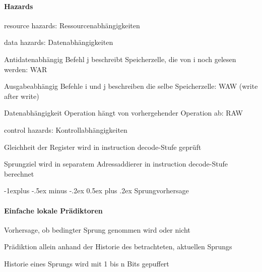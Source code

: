 \documentclass[10pt,landscape]{article}
\makeatletter
\renewcommand{\subsection}{\@startsection{subsection}{2}{0mm}%
                                {-1explus -.5ex minus -.2ex}%
                                {0.5ex plus .2ex}%
                                {\normalfont\normalsize\bfseries}}
\makeatother
\begin{document}
\begin{multicols}{3}
  \paragraph*{Hazards}
  \begin{itemize*}
    \item resource hazards: Ressourcenabhängigkeiten
    \item data hazards: Datenabhängigkeiten
    \begin{description*}
      \item[Antidatenabhängig] Befehl j beschreibt Speicherzelle, die von i noch gelesen werden: WAR
      \item[Ausgabeabhängig] Befehle i und j beschreiben die selbe Speicherzelle: WAW (write after write)
      \item[Datenabhängigkeit] Operation hängt von vorhergehender Operation ab: RAW
    \end{description*}
    \item control hazards: Kontrollabhängigkeiten
    \begin{itemize*}
      \item Gleichheit der Register wird in instruction decode-Stufe geprüft
      \item Sprungziel wird in separatem Adressaddierer in instruction decode-Stufe berechnet
    \end{itemize*}
  \end{itemize*}
  
  \subsection{Sprungvorhersage}
  \paragraph{Einfache lokale Prädiktoren}
  \begin{itemize*}
    \item Vorhersage, ob bedingter Sprung genommen wird oder nicht
    \item Prädiktion allein anhand der Historie des betrachteten, aktuellen Sprungs
    \item Historie eines Sprungs wird mit 1 bis n Bits gepuffert
  \end{itemize*}
  

\end{multicols}
\end{document}

